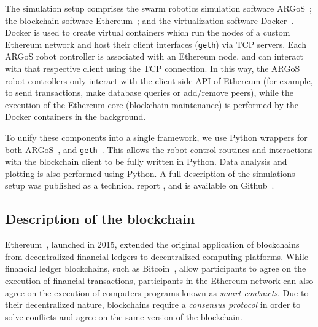 \documentclass[runningheads]{llncs}
\begin{document}
The simulation setup comprises the swarm robotics simulation software ARGoS~\cite{pinciroli_2012_si_argos}; the blockchain software Ethereum~\cite{buterin_2014_ethereum}; and the virtualization software Docker~\cite{merkel_2014_docker}. Docker is used to create virtual containers which run the nodes of a custom Ethereum network and host their client interfaces (\texttt{geth}) via TCP servers. Each ARGoS robot controller is associated with an Ethereum node, and can interact with that respective client using the TCP connection.
In this way, the ARGoS robot controllers only interact with the client-side API of Ethereum (for example, to send transactions, make database queries or add/remove peers), while the execution of the Ethereum core (blockchain maintenance) is performed by the Docker containers in the background.
 
 To unify these components into a single framework, we use Python wrappers for both ARGoS~\cite{ken_argos_python}, and \texttt{geth}~\cite{web3py_2022}. This allows the robot control routines and interactions with the blockchain client to be fully written in Python. Data analysis and plotting is also performed using Python. A full description of the simulations setup was published as a technical report \cite{PacStrDor2020_techreport}, and is available on Github~\cite{teksander_argos_geth_github}.

\subsection{Description of the blockchain}
 Ethereum~\cite{buterin_2014_ethereum}, launched in 2015, extended the original application of blockchains from decentralized financial ledgers to decentralized computing platforms. While financial ledger blockchains, such as Bitcoin~\cite{bitcoin_online}, allow participants to agree on the execution of financial transactions, participants in the Ethereum network can also agree on the execution of computers programs known as \emph{smart contracts}. Due to their decentralized nature, blockchains require a \emph{consensus protocol} in order to solve conflicts and agree on the same version of the blockchain. %
 
\vspace{-5mm}
\end{document}
